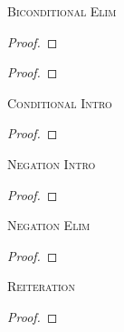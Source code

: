 \begin{multicols}{2}
\noindent\textsc{Biconditional Elim}

\begin{proof}
	 
\end{proof}

\begin{proof}
	 
\end{proof}
\bigskip



\vfill\null
\columnbreak


\noindent\textsc{Conditional Intro}

\nopagebreak
\begin{proof}
	\open
		 \as{}
	\close
	 
\end{proof}
\bigskip


\noindent\textsc{Negation Intro}

\begin{proof}
	\open
		 \as{}
	\close
	 
\end{proof}
\bigskip


\noindent\textsc{Negation Elim}\label{ProofRules-end}

\begin{proof}
	\open
		 \as{}
	\close
	 
\end{proof}
\bigskip


\noindent\textsc{Reiteration}

\begin{proof}
	 
\end{proof}


\vfill\null

\begin{comment}
\section{Derived rules for TFL}


\end{comment}
\end{multicols}
